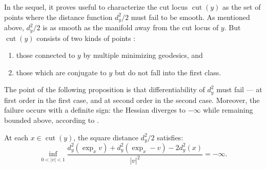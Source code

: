 In the sequel, it proves useful to characterize the cut locus \( \operatorname { cut } ( y ) \) as
the set of points where the distance function \( d _ { y } ^ { 2 } / 2 \) must fail to be smooth.
As mentioned above,
\( d _ { y } ^ { 2 } / 2 \) is as smooth as the manifold away from the cut locus of \( y \).
But \( \operatorname{cut} ( y ) \) consists of two kinds of points \cite[Scholium 3.78]{gallot2004riemannian}:
\begin{enumerate}
	\item those connected to \( y \) by multiple minimizing geodesics, and
	\item	those which are conjugate to \( y \) but do not fall into the first class.
\end{enumerate}
The point of the following proposition \cite[Proposition 2.5]{cordero2001riemannian}
is that differentiability of \( d _ { y } ^ { 2 } \) must fail --- at first order in the first case,
and at second order in the second case.
Moreover, the failure occurs with a definite sign:
the Hessian diverges to $-\infty$ while remaining bounded above, according to .

\begin{prop}
	\label{prop:distance_cut_locus}
	At each \( x \in \operatorname { cut } ( y ) \), the square distance \( d _ { y } ^ { 2 } / 2 \) satisfies:
	\[ \inf _ { 0 < | v | < 1 } \frac { d_y^2 \left( \exp _ { x } v \right) + d_y^2 \left( \exp _ { x } - v \right)
		- 2 d_y^2 ( x ) } { | v | ^ { 2 } } = - \infty. \]
\end{prop}
